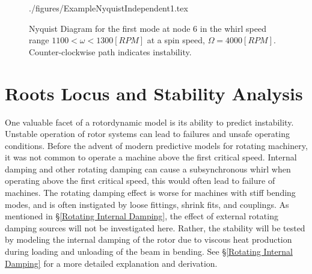 \begin{figure}
	\def\width{.4\linewidth}
	\def\sep{2.5cm}
	\centering
	{./figures/ExampleNyquistIndependent1.tex}
	\caption{Nyquist Diagram for the first mode at node 6 in the whirl speed range $ 1100 < \omega < 1300[RPM] $ at a spin speed, $ \Omega=4000[RPM] $. Counter-clockwise path indicates instability.}
	\label{fig:ExampleNyquistIndependent1}
\end{figure}
\section{Roots Locus and Stability Analysis}
One valuable facet of a rotordynamic model is its ability to predict instability. Unstable operation of rotor systems can lead to failures and unsafe operating conditions. Before the advent of modern predictive models for rotating machinery, it was not common to operate a machine above the first critical speed. Internal damping and other rotating damping can cause a subsynchronous whirl when operating above the first critical speed, this would often lead to failure of machines. The rotating damping effect is worse for machines with stiff bending modes, and is often instigated by loose fittings, shrink fits, and couplings. As mentioned in \S\ref{Rotating Internal Damping}, the effect of external rotating damping sources will not be investigated here. Rather, the stability will be tested by modeling the internal damping of the rotor due to viscous heat production during loading and unloading of the beam in bending. See \S\ref{Rotating Internal Damping} for a more detailed explanation and derivation.\par 
